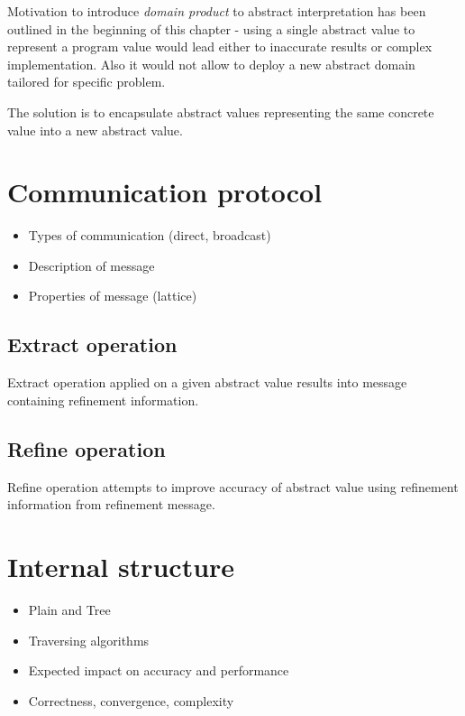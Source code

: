 \documentclass[12pt,oneside,draft]{fithesis2}
\begin{document}
Motivation to introduce \textit{domain product} to abstract interpretation has been outlined in the beginning of this chapter - using a single abstract value to represent a program value would lead either to inaccurate results or complex implementation. Also it would not allow to deploy a new abstract domain tailored for specific problem. \cite{CousotEtAl06-ASIAN}

The solution is to encapsulate abstract values representing the same concrete value into a new abstract value.

\section{Communication protocol}
\begin{itemize}
  \item Types of communication (direct, broadcast)
  \item Description of message
  \item Properties of message (lattice)
\end{itemize}

\subsection{Extract operation}

Extract operation applied on a given abstract value results into message containing refinement information.

\subsection{Refine operation}

Refine operation attempts to improve accuracy of abstract value using refinement information from refinement message.

\section{Internal structure}
\begin{itemize}
  \item Plain and Tree
  \item Traversing algorithms
  \item Expected impact on accuracy and performance
  \item Correctness, convergence, complexity
\end{itemize}
\end{document}
